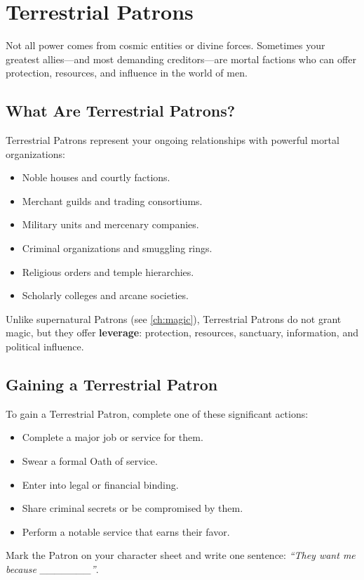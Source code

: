 \section{Terrestrial Patrons}
\label{sec:terrestrial-patrons}

Not all power comes from cosmic entities or divine forces. Sometimes your greatest allies—and most demanding creditors—are mortal factions who can offer protection, resources, and influence in the world of men.

\subsection{What Are Terrestrial Patrons?}
\label{sec:terrestrial-definition}

Terrestrial Patrons represent your ongoing relationships with powerful mortal organizations:
\begin{itemize}
    \item Noble houses and courtly factions.
    \item Merchant guilds and trading consortiums.
    \item Military units and mercenary companies.
    \item Criminal organizations and smuggling rings.
    \item Religious orders and temple hierarchies.
    \item Scholarly colleges and arcane societies.
\end{itemize}

Unlike supernatural Patrons (see \ref{ch:magic}), Terrestrial Patrons do not grant magic, but they offer \textbf{leverage}: protection, resources, sanctuary, information, and political influence.

\subsection{Gaining a Terrestrial Patron}
\label{sec:terrestrial-gaining}

To gain a Terrestrial Patron, complete one of these significant actions:
\begin{itemize}
    \item Complete a major job or service for them.
    \item Swear a formal Oath of service.
    \item Enter into legal or financial binding.
    \item Share criminal secrets or be compromised by them.
    \item Perform a notable service that earns their favor.
\end{itemize}
Mark the Patron on your character sheet and write one sentence: \emph{``They want me because \_\_\_\_\_\_\_''}.

